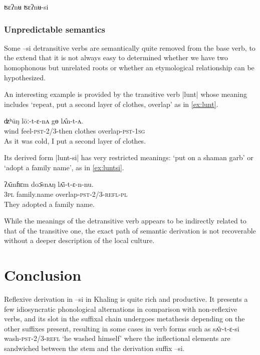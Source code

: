 \documentclass[twoside,a4paper,11pt]{article}
\newcommand{\ipa}[1]{{\phon#1}}
\begin{document}
\ipa{ʦɛʔnʉ} \ipa{ʦɛʔnʉ-si}

\subsubsection{Unpredictable semantics}



Some \ipa{--si} detransitive verbs are semantically quite removed from the base verb, to the extend that it is not always easy to determined whether we have two homophonous but unrelated roots or whether an etymological relationship can be hypothesized.

An interesting example is provided by the transitive verb |\ipa{lunt}| whose meaning includes `repeat, put a second layer of clothes, overlap' as in \ref{ex:lunt}.
\begin{exe}
\ex \label{ex:lunt}
\gll 
\ipa{ʣʰūŋ}  	\ipa{lōː-t-ɛ-nʌ}  	\ipa{gɵ}  	\ipa{lʌ̂n-t-ʌ.}  \\
wind feel-\textsc{pst-2/3}-then clothes overlap-\textsc{pst-1sg} \\ 
\glt As it was cold, I put a second layer of clothes.
\end{exe}

Its derived form |\ipa{lunt-si}| has very restricted meanings: `put on a shaman garb' or `adopt a family name', as in \ref{ex:luntsi}.

\begin{exe}
\ex \label{ex:luntsi}
\gll 
\ipa{ʔʌ̄mɦɛm}  	\ipa{doɔ̄snʌŋ}  	\ipa{lʌ̄i-t-ɛ-n-nu.}  \\
\textsc{3pl} family.name overlap-\textsc{pst-2/3-refl-pl} \\
\glt They adopted a family name.
\end{exe}

While the meanings of the detransitive verb appears to be indirectly related to that of the transitive one, the exact path of semantic derivation is not recoverable without a deeper description of the local culture.

\section{Conclusion}
Reflexive derivation in \ipa{--si} in Khaling is quite rich and productive. It  presents a few idiosyncratic phonological alternations in comparison with non-reflexive verbs, and its slot in the suffixal chain undergoes metathesis depending on the other suffixes present,  resulting in some cases in verb forms such as \ipa{sʌ̄r-t-ɛ-si} wash-\textsc{pst-2/3-refl} `he washed himself' where the inflectional elements are sandwiched between the stem and the derivation suffix \ipa{--si}.
\end{document}
